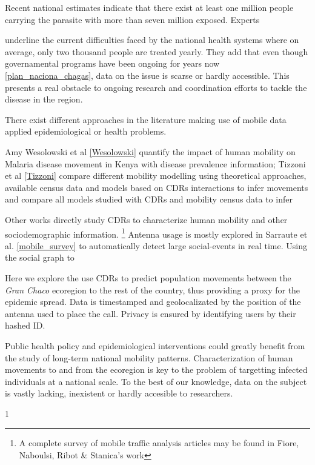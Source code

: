 Recent national estimates indicate that there exist at least one million people carrying the parasite with more than seven million exposed. Experts \begin{comment}  aca como referencio a Diego Weinberg y Mundo Sano? \end{comment} underline the current difficulties faced by the national health systems where on average, only two thousand people are treated yearly. They add that even though governamental programs have been ongoing for years now \ref{plan_naciona_chagas}, data on the issue is scarse or hardly accessible. This presents a real obstacle to ongoing research and coordination efforts to tackle the disease in the region.

There exist different approaches in the literature making use of mobile data applied epidemiological or health problems.\begin{comment} La siguiente info la saco de aqui  https://docs.google.com/document/d/1ZClgYFTLCxmg7wvRXqz2V1EP7Wcg0vd2ZwEBOLW2VOk \end{comment} Amy Wesolowski et al \ref{Wesolowski}  quantify the impact of human mobility on Malaria disease movement in Kenya with disease prevalence information; Tizzoni et al \ref{Tizzoni} compare different mobility modelling using theoretical approaches, available census data and models based on CDRs interactions to infer movements and compare all models studied with CDRs and mobility census data to infer

Other works directly study CDRs to characterize human mobility and other sociodemographic information. \footnote{A complete survey of mobile traffic analysis articles may be found in Fiore, Naboulsi, Ribot & Stanica's work} Antenna usage is mostly explored in Sarraute et al. \ref{mobile_survey} to automatically detect large social-events in real time. Using the social graph to 


Here we explore the use CDRs to predict population movements between the \textit{Gran Chaco} ecoregion to the rest of the country, thus providing a proxy for the epidemic spread. Data is timestamped and geolocalizated by the position of the antenna used to place the call. Privacy is ensured by identifying users by their hashed ID. \begin{comment}el tema de la privacidad es siempre tan importante que lo pongo aca... haria falta agregar que no tenemos acceso a las claves de encriptacion. \end{comment}

Public health policy and epidemiological interventions could greatly benefit from the study of long-term national mobility patterns. Characterization of human movements to and from the ecoregion is key to the problem of targetting infected individuals at a national scale. To the best of our knowledge, data on the subject is vastly lacking, inexistent or hardly accesible to researchers. 

1